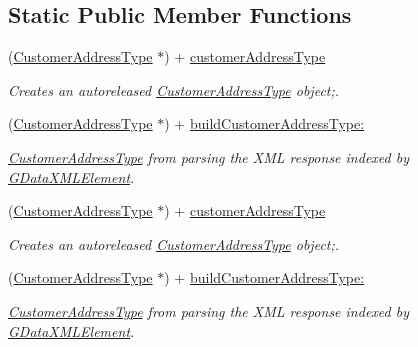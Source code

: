 \subsection*{Static Public Member Functions}
\begin{DoxyCompactItemize}
\item 
(\hyperlink{interface_customer_address_type}{CustomerAddressType} $\ast$) + \hyperlink{interface_customer_address_type_ae4fb6cc0fb89c3f995c7f6c331b1a0cf}{customerAddressType}
\begin{DoxyCompactList}\small\item\em Creates an autoreleased \hyperlink{interface_customer_address_type}{CustomerAddressType} object;. \item\end{DoxyCompactList}\item 
(\hyperlink{interface_customer_address_type}{CustomerAddressType} $\ast$) + \hyperlink{interface_customer_address_type_a6ce0bcef3cbd2fe97e8ed07602c352eb}{buildCustomerAddressType:}
\begin{DoxyCompactList}\small\item\em \hyperlink{interface_customer_address_type}{CustomerAddressType} from parsing the XML response indexed by \hyperlink{interface_g_data_x_m_l_element}{GDataXMLElement}. \item\end{DoxyCompactList}\item 
(\hyperlink{interface_customer_address_type}{CustomerAddressType} $\ast$) + \hyperlink{interface_customer_address_type_ae4fb6cc0fb89c3f995c7f6c331b1a0cf}{customerAddressType}
\begin{DoxyCompactList}\small\item\em Creates an autoreleased \hyperlink{interface_customer_address_type}{CustomerAddressType} object;. \item\end{DoxyCompactList}\item 
(\hyperlink{interface_customer_address_type}{CustomerAddressType} $\ast$) + \hyperlink{interface_customer_address_type_a6ce0bcef3cbd2fe97e8ed07602c352eb}{buildCustomerAddressType:}
\begin{DoxyCompactList}\small\item\em \hyperlink{interface_customer_address_type}{CustomerAddressType} from parsing the XML response indexed by \hyperlink{interface_g_data_x_m_l_element}{GDataXMLElement}. \item\end{DoxyCompactList}\item 

\end{DoxyCompactItemize}
